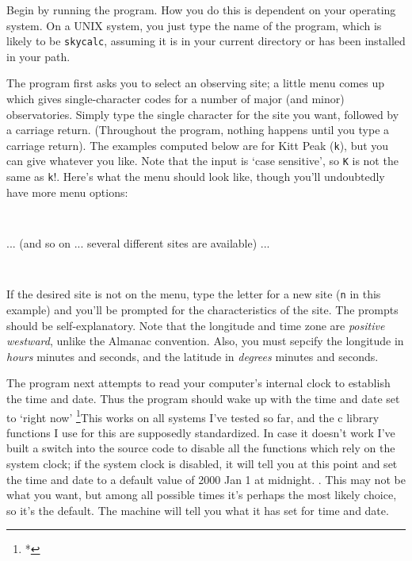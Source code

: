 
Begin by running the program.  How you do this is dependent
on your operating system.  On a UNIX system, you just
type the name of the program, which is likely to be 
{\tt skycalc}, assuming it is in your current directory or
has been installed in your path.
\par
The program first asks you to select an observing 
site; a little menu comes up which gives single-character
codes for a number of major (and minor) observatories.
Simply type the single character for the site you want, followed
by a carriage return.  (Throughout the program, nothing happens
until you type a carriage return).  The examples computed below
are for Kitt Peak ({\tt k}), but you can give whatever you like.
Note that the input
is `case sensitive', so {\tt K} is not the same as {\tt k}!.  
Here's what the menu should look like, though you'll 
undoubtedly have more menu options:
\par

{\tt\obeyspaces
\line{\hfil }
\line{\hfil }
}	

\par

... (and so on ... several different sites are available) ...
\medskip\par
{\tt\obeyspaces
{}
}

\par

If the desired site is not on the menu, type the letter
for a new site ({\tt n} in this example) and you'll be prompted for the
characteristics of the site.  The prompts should be
self-explanatory.  Note that the longitude and time zone are
{\sl positive westward}, unlike the Almanac convention.  Also, you
must sepcify the longitude in {\sl hours} minutes and seconds, 
and the latitude in {\sl degrees} minutes and seconds.
\par

The program next attempts to read
your computer's internal clock to establish the time and date.
Thus the program should wake up with the time and date
set to `right now'
\footnote{*}{This works on all systems I've tested so far,
and the c library functions I use for this are supposedly standardized.
In case it doesn't work I've built a switch into the 
source code to disable all the functions which rely on the system clock;
if the system
clock is disabled, it will tell you at this point and set the time
and date to a default value of 2000 Jan 1 at midnight.}
.   This may not be what you want, but among all possible times
it's perhaps the most likely choice, so it's the default.
The machine will tell you what it has set for time and date.


